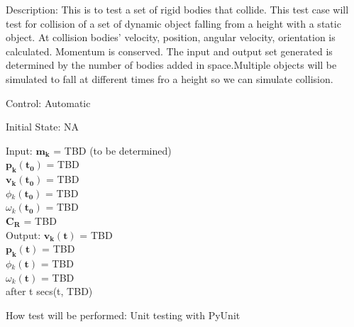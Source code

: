 \documentclass[12pt, titlepage]{article}
\begin{document}
\begin{enumerate}
Description: This is to test a set of rigid bodies that collide. This test case will test for collision of a set of dynamic object falling from a height with a static object. At collision bodies' velocity, position, angular velocity, orientation is calculated. Momentum is conserved. The input and output set generated is determined by the number of bodies added in space.Multiple objects will be simulated to fall at different times fro a height so we can simulate collision.

Control: Automatic

Initial State: NA

Input: $\mathbf{m_k}$$\mathbf{}$ = TBD (to be determined)\\
\hspace*{1.3cm}$\mathbf{p_k}$$\mathbf{(t_0)}$ = TBD\\
\hspace*{1.3cm}$\mathbf{v_k}$$\mathbf{(t_0)}$ = TBD\\
\hspace*{1.3cm}$\phi$$_k\mathbf{(t_0)}$ = TBD\\
\hspace*{1.3cm}$\omega$$_k\mathbf{(t_0)}$$ \mathbf{}$ = TBD\\
\hspace*{1.3cm}$\mathbf{C_R}$$\mathbf{}$ = TBD \\


Output:  $\mathbf{v_k}$$\mathbf{(t)}$ = TBD \\
\hspace*{1.3cm}$\mathbf{p_k}$$\mathbf{(t)}$ = TBD\\
\hspace*{1.3cm}$\phi$$_k\mathbf{(t)}$ = TBD\\
\hspace*{1.3cm}$\omega$$_k\mathbf{(t)}$$ \mathbf{}$ = TBD\\
after t secs(t, TBD) 

How test will be performed: Unit testing with PyUnit

\end{enumerate}	
	
\end{document}

